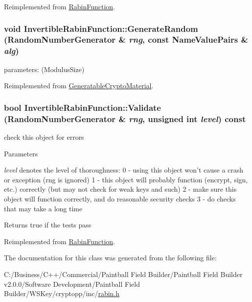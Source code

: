 Reimplemented from \hyperlink{class_rabin_function_ae585a0d58b1b95579459c2b42eea980c}{RabinFunction}.\hypertarget{class_invertible_rabin_function_a571737380b956b4add10c855484af670}{
\subsubsection[{GenerateRandom}]{\setlength{\rightskip}{0pt plus 5cm}void InvertibleRabinFunction::GenerateRandom ({\bf RandomNumberGenerator} \& {\em rng}, \/  const {\bf NameValuePairs} \& {\em alg})}}
\label{class_invertible_rabin_function_a571737380b956b4add10c855484af670}
parameters: (ModulusSize) 

Reimplemented from \hyperlink{class_generatable_crypto_material_abe368b52db1ca7079b690f2d6e605f7a}{GeneratableCryptoMaterial}.\hypertarget{class_invertible_rabin_function_ab943e623f7f1ffb3d890c1ab9e4e3474}{
\subsubsection[{Validate}]{\setlength{\rightskip}{0pt plus 5cm}bool InvertibleRabinFunction::Validate ({\bf RandomNumberGenerator} \& {\em rng}, \/  unsigned int {\em level}) const}}
\label{class_invertible_rabin_function_ab943e623f7f1ffb3d890c1ab9e4e3474}


check this object for errors 
\begin{DoxyParams}{Parameters}
\item[{\em level}]denotes the level of thoroughness: 0 -\/ using this object won't cause a crash or exception (rng is ignored) 1 -\/ this object will probably function (encrypt, sign, etc.) correctly (but may not check for weak keys and such) 2 -\/ make sure this object will function correctly, and do reasonable security checks 3 -\/ do checks that may take a long time \end{DoxyParams}
\begin{DoxyReturn}{Returns}
true if the tests pass 
\end{DoxyReturn}


Reimplemented from \hyperlink{class_rabin_function_a0134de415d790de6cb65d5b9940f36e5}{RabinFunction}.

The documentation for this class was generated from the following file:\begin{DoxyCompactItemize}
\item 
C:/Business/C++/Commercial/Paintball Field Builder/Paintball Field Builder v2.0.0/Software Development/Paintball Field Builder/WSKey/cryptopp/inc/\hyperlink{rabin_8h}{rabin.h}\end{DoxyCompactItemize}
